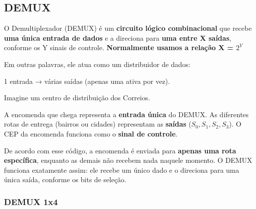 \documentclass[12pt]{article}
\begin{document}
\subsection{DEMUX}
O Demultiplexador (DEMUX) é um \textbf{circuito lógico combinacional} que recebe \textbf{uma única entrada de dados} e a direciona para \textbf{uma entre X saídas}, conforme os Y sinais de controle.
\textbf{Normalmente usamos a relação X = $2^Y$}

Em outras palavras, ele atua como um distribuidor de dados:

1 entrada → várias saídas (apenas uma ativa por vez).

\begin{tcolorbox}[mynote, title=\textbf{Exemplo}]
Imagine um centro de distribuição dos Correios.

A encomenda que chega representa a \textbf{entrada única} do DEMUX.  
As diferentes rotas de entrega (bairros ou cidades) representam as \textbf{saídas} ($S_0, S_1, S_2, S_3$).  
O CEP da encomenda funciona como o \textbf{sinal de controle}.

De acordo com esse código, a encomenda é enviada para \textbf{apenas uma rota específica}, enquanto as demais não recebem nada naquele momento.
O DEMUX funciona exatamente assim: ele recebe um único dado e o direciona para uma única saída, conforme os bits de seleção.
\end{tcolorbox}

\subsubsection{DEMUX 1x4}

\begin{figure}[h]
\centering
{}
\end{figure}
\end{document}
